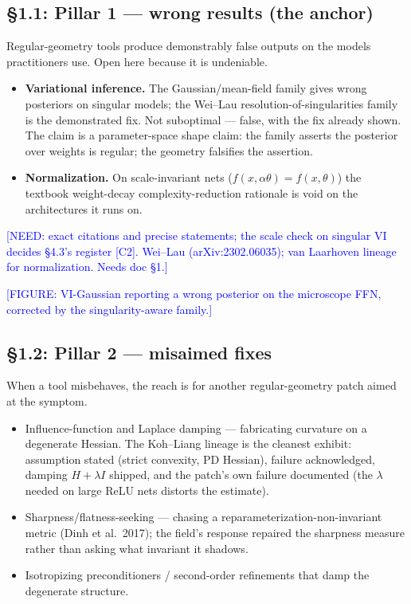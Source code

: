 \documentclass[11pt]{article}
\newcommand{\tagg}[1]{\textcolor{blue}{[#1]}}
\begin{document}
\subsection*{\S1.1: Pillar 1 --- wrong results (the anchor)}

Regular-geometry tools produce demonstrably false outputs on the models
practitioners use. Open here because it is undeniable.

\begin{itemize}[nosep]
\item \textbf{Variational inference.} The Gaussian/mean-field family
gives wrong posteriors on singular models; the Wei--Lau
resolution-of-singularities family is the demonstrated fix. Not
suboptimal --- false, with the fix already shown. The claim is a
parameter-space shape claim: the family asserts the posterior over
weights is regular; the geometry falsifies the assertion.
\item \textbf{Normalization.} On scale-invariant nets
($f(x,\alpha\theta)=f(x,\theta)$) the textbook weight-decay
complexity-reduction rationale is void on the architectures it runs on.
\end{itemize}

\tagg{NEED: exact citations and precise statements; the scale check on
singular VI decides \S4.3's register [C2]. Wei--Lau (arXiv:2302.06035);
van Laarhoven lineage for normalization. Needs doc \S1.}

\tagg{FIGURE: VI-Gaussian reporting a wrong posterior on the microscope
FFN, corrected by the singularity-aware family.}

\subsection*{\S1.2: Pillar 2 --- misaimed fixes}

When a tool misbehaves, the reach is for another regular-geometry patch
aimed at the symptom.

\begin{itemize}[nosep]
\item Influence-function and Laplace damping --- fabricating curvature on
a degenerate Hessian. The Koh--Liang lineage is the cleanest exhibit:
assumption stated (strict convexity, PD Hessian), failure acknowledged,
damping $H+\lambda I$ shipped, and the patch's own failure documented
(the $\lambda$ needed on large ReLU nets distorts the estimate).
\item Sharpness/flatness-seeking --- chasing a
reparameterization-non-invariant metric (Dinh et al.\ 2017); the field's
response repaired the sharpness measure rather than asking what invariant
it shadows.
\item Isotropizing preconditioners / second-order refinements that damp
the degenerate structure.
\end{itemize}
\end{document}
